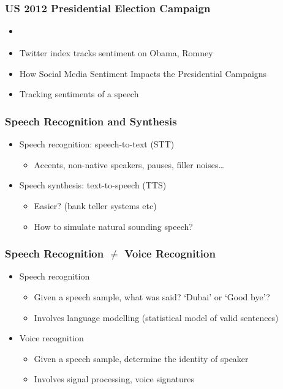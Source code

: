 \begin{frame}
\frametitle{US 2012 Presidential Election Campaign}
    
\begin{itemize}
\item {} \parencite{wang2012system}
\item Twitter index tracks sentiment on Obama, Romney \href{http://usatoday30.usatoday.com/news/politics/story/2012-08-01/twitter-political-index/56649678/1}{}
\item How Social Media Sentiment Impacts the Presidential Campaigns \href{http://contently.com/strategist/2012/10/24/social-media-sentiment-becomes-factor-in-presidential-campaigns/}{}
\item Tracking sentiments of a speech \href{http://sentiment.dev.ber.to/}{}
\end{itemize}

\end{frame}


\begin{frame}
\frametitle{Speech Recognition and Synthesis}

\begin{itemize}[<+->]
\item Speech recognition: speech-to-text (STT)
	\begin{itemize}
	\item Accents, non-native speakers, pauses, filler noises\ldots
	\end{itemize}
\item Speech synthesis: text-to-speech (TTS)
	\begin{itemize}
	\item Easier? (bank teller systems etc)
	\item How to simulate \alert{natural sounding} speech?
	\end{itemize}
\end{itemize}

\end{frame}

\begin{frame}
\frametitle{Speech Recognition $\neq$ Voice Recognition}
\begin{itemize}[<+->]
\item Speech recognition
	\begin{itemize}
	\item Given a speech sample, what was said? `Dubai' or `Good bye'?
	\item Involves language modelling (statistical model of valid sentences)
	\end{itemize}
\item Voice recognition
	\begin{itemize}
	\item Given a speech sample, determine the identity of speaker
	\item Involves signal processing, voice signatures
	\end{itemize}
\end{itemize}
\end{frame}

